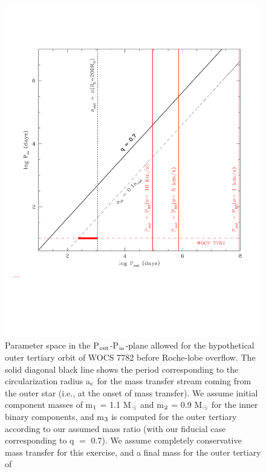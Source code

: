 \documentclass[twocolumn]{aastex62}
\begin{document}
\begin{figure}[ht!]
\includegraphics[width=\columnwidth]{fig_parameterspace.pdf}
\caption{Parameter space in the P$_{\rm out}$-P$_{\rm in}$-plane
  allowed for the hypothetical outer tertiary orbit of WOCS 7782
  before Roche-lobe overflow.  The solid diagonal black line shows the
  period corresponding to the circularization radius a$_{\rm c}$ for
  the mass transfer stream coming from the outer star (i.e., at the
  onset of mass transfer).  
We assume initial component masses of m$_{\rm 1}$ = 1.1 M$_{\rm
  \odot}$ and m$_{\rm 2}$ = 0.9 M$_{\rm \odot}$ for the inner binary
components, and m$_{\rm 3}$ is computed for the outer tertiary
according to our assumed mass ratio (with our fiducial case
corresponding to q $=$ 0.7).  We assume completely conservative mass
transfer for this exercise, and a final mass for the outer tertiary of
}
\end{figure}
\end{document}
